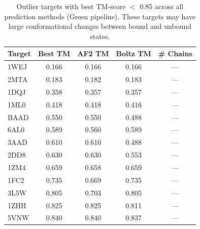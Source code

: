 \begin{table}[htbp]
\centering
\caption{Outlier targets with best TM-score $<$ 0.85 across all prediction methods (Green pipeline). These targets may have large conformational changes between bound and unbound states.}
\label{tab:outliers-green}
\begin{tabular}{lcccc}
\toprule
Target & Best TM & AF2 TM & Boltz TM & \# Chains \\
\midrule
  1WEJ & 0.166 & 0.166 & 0.166 & --- \\
  2MTA & 0.183 & 0.182 & 0.183 & --- \\
  1DQJ & 0.358 & 0.357 & 0.357 & --- \\
  1ML0 & 0.418 & 0.418 & 0.416 & --- \\
  BAAD & 0.550 & 0.550 & 0.488 & --- \\
  6AL0 & 0.589 & 0.560 & 0.589 & --- \\
  3AAD & 0.610 & 0.610 & 0.488 & --- \\
  2DD8 & 0.630 & 0.630 & 0.553 & --- \\
  1ZM4 & 0.659 & 0.658 & 0.659 & --- \\
  1FC2 & 0.735 & 0.669 & 0.735 & --- \\
  3L5W & 0.805 & 0.703 & 0.805 & --- \\
  1ZHH & 0.825 & 0.825 & 0.811 & --- \\
  5VNW & 0.840 & 0.840 & 0.837 & --- \\
\bottomrule
\end{tabular}
\end{table}